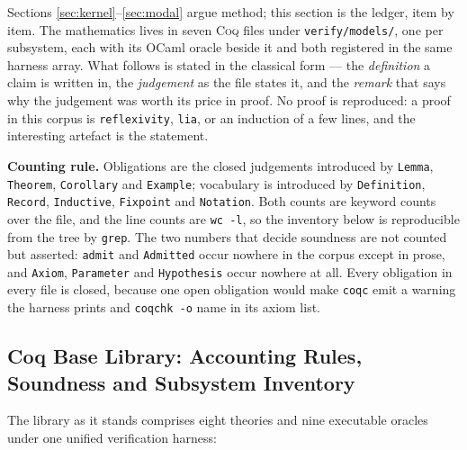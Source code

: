 \documentclass[10pt,journal,compsoc,twocolumn]{article}
\theoremstyle{definition}
\theoremstyle{remark}
\theoremstyle{plain}
\newcommand{\Coq}{\textsc{Coq}}
\newcommand{\ctr}[1]{\texttt{#1}}
\begin{document}
Sections \ref{sec:kernel}--\ref{sec:modal} argue method; this section is the
ledger, item by item. The mathematics lives in seven \Coq{} files under
\ctr{verify/models/}, one per subsystem, each with its OCaml oracle beside it and
both registered in the same harness array. What follows is stated in the
classical form --- the \emph{definition} a claim is written in, the
\emph{judgement} as the file states it, and the \emph{remark} that says why the
judgement was worth its price in proof. No proof is reproduced: a proof in this
corpus is \ctr{reflexivity}, \ctr{lia}, or an induction of a few lines, and the
interesting artefact is the statement.

\textbf{Counting rule.} Obligations are the closed judgements introduced by
\ctr{Lemma}, \ctr{Theorem}, \ctr{Corollary} and \ctr{Example}; vocabulary is
introduced by \ctr{Definition}, \ctr{Record}, \ctr{Inductive}, \ctr{Fixpoint} and
\ctr{Notation}. Both counts are keyword counts over the file, and the line counts are
\ctr{wc -l}, so the inventory below is reproducible from the tree by \ctr{grep}. The two numbers that decide
soundness are not counted but asserted: \ctr{admit} and \ctr{Admitted} occur
nowhere in the corpus except in prose, and \ctr{Axiom}, \ctr{Parameter} and
\ctr{Hypothesis} occur nowhere at all. Every obligation in every file is closed,
because one open obligation would make \ctr{coqc} emit a warning the harness
prints and \ctr{coqchk -o} name in its axiom list.

\subsection{Coq Base Library: Accounting Rules, Soundness and Subsystem Inventory}
\label{sec:acct:inventory}

The library as it stands comprises eight theories and nine executable oracles under one unified verification harness:
\end{document}
